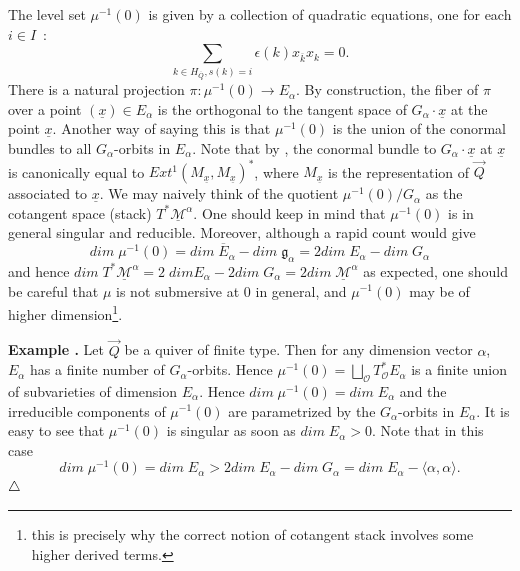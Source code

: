 \documentclass[a4paper,10pt]{amsart}
\def\endexample{$\hfill \triangle$}
\def\vecdq{\overline{Q}}
\def\endexample{$\hfill \triangle$}
\def\a{\alpha}
\def\g{\mathfrak{g}}
\numberwithin{equation}{section}
\begin{document}
\vspace{.1in}

The level set $\mu^{-1}(0)$ is given by a collection of quadratic equations, one for each $i \in I$~:
$$\sum_{k \in H_{\vecdq}, s(k)=i} \epsilon(k) x_{\overline{k}}x_{k}=0.$$
There is a natural projection $\pi:\mu^{-1}(0) \to E_{\a}$. By construction, the fiber of $\pi$ over a point $(\underline{x}) \in E_{\a}$ is the orthogonal to the tangent space of $G_{\a} \cdot \underline{x}$ at the point $\underline{x}$. Another way of saying this is that $\mu^{-1}(0)$ is the union of the conormal bundles to all $G_{\a}$-orbits in $E_{\a}$. Note that by \cite{Brion}, the conormal bundle to $G_{\a} \cdot \underline{x}$ at $\underline{x}$ is canonically equal to $Ext^1(M_{\underline{x}},M_{\underline{x}})^*$, where $M_{\underline{x}}$ is the representation of $\vec{Q}$ associated to $\underline{x}$. We may naively think of the quotient $\mu^{-1}(0)/G_{\a}$ as the cotangent space (stack) $T^* \underline{\mathcal{M}}^{\a}$. One should keep in mind that $\mu^{-1}(0)$ is in general singular and reducible. Moreover, although a rapid count would give
$$dim\;\mu^{-1}(0)=dim\;\overline{E}_{\a}-dim\;\g_{\a}=2dim\;E_{\a}-dim\;G_{\a}$$
and hence $dim\;T^*\underline{\mathcal{M}}^{\a}=2\;dim E_{\a}-2 dim\;G_{\a}=2 dim\;\underline{\mathcal{M}}^{\a}$ as expected, one should be careful that $\mu$ is not submersive at $0$ in general, and $\mu^{-1}(0)$ may be of higher dimension\footnote{this is precisely why the correct notion of cotangent stack involves some higher derived terms.}. 

\vspace{.2in}

\addtocounter{theo}{1}
\noindent \textbf{Example \thetheo .} Let $\vec{Q}$ be a quiver of finite type. Then for any dimension vector $\a$, $E_{\a}$ has a finite number of $G_{\a}$-orbits. Hence $\mu^{-1}(0)=\bigsqcup_{\mathcal{O}} T^*_{\mathcal{O}}E_{\a}$ is a finite union of subvarieties of dimension $E_{\a}$. Hence $dim\;\mu^{-1}(0)=dim\;E_{\a}$ and the irreducible components of $\mu^{-1}(0)$ are parametrized by the $G_{\a}$-orbits in $E_{\a}$. It is easy to see that $\mu^{-1}(0)$ is singular as soon as $dim\;E_{\a} >0$. Note that in this case
$$dim\;\mu^{-1}(0)=dim\;E_{\a} > 2 dim\;E_{\a}-dim\;G_{\a}=dim\;E_{\a} -\langle \a, \a \rangle.$$
 \endexample

\vspace{.2in}
\end{document}
